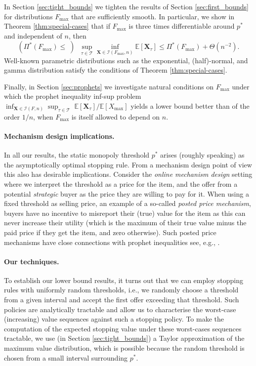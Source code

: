\documentclass[11pt,a4paper]{article}
\numberwithin{equation}{section}
\begin{document}
In Section \ref{sec:tight_bounds} we tighten the results of Section \ref{sec:first_bounds} for distributions $F_{\max}$ that are sufficiently smooth. In particular, we show in Theorem \ref{thm:special-cases} that if $F_{\max}$ is three times differentiable around $p^*$ and independent of $n$, then 
$$
\left( \Pi^*(F_{\max}) \leq \; \right) \; \;  \sup_{\tau\in\mathcal{T}} \inf_{\boldsymbol{X}\in\mathcal{I}(F_{\max}, n)} \mathbb{E}[\boldsymbol{X}_{\tau}] \leq \Pi^*(F_{\max})+\Theta\left(n^{-2}\right).
$$
Well-known parametric distributions such as the exponential, (half)-normal, and gamma distribution satisfy the conditions of Theorem \ref{thm:special-cases}.

Finally, in Section \ref{sec:prophets} we investigate natural conditions on $F_{\max}$ under which the prophet inequality inf-sup problem $\inf_{\boldsymbol{X}\in\mathcal{I}(F, n)}\sup_{\tau\in\mathcal{T}} \; \mathbb{E}[\boldsymbol{X}_{\tau}]/\mathbb{E}[X_{\max}]$ yields a lower bound better than of the order $1/n$, when $F_{\max}$ is itself allowed to depend on $n$. 
\noindent 
\paragraph{Mechanism design implications.} In all our results, the static monopoly threshold $p^*$ arises (roughly speaking) as the asymptotically optimal stopping rule. From a mechanism design point of view this also has desirable implications. Consider the \textit{online mechanism design} setting where we interpret the threshold as a price for the item, and the offer from a potential \textit{strategic} buyer as the price they are willing to pay for it. When using a fixed threshold as selling price, an example of a so-called \textit{posted price mechanism}, buyers have no incentive to misreport their (true) value for the item as this can never increase their utility (which is the maximum of their true value minus the paid price if they get the item, and zero otherwise). Such posted price mechanisms have close connections with prophet inequalities see, e.g., \cite{hajiaghayi2007automated,chawla2010multi,correa2019pricing}.

{
\paragraph{Our techniques.} To establish our lower bound results, it turns out that we can employ stopping rules with uniformly random thresholds, i.e., we randomly choose a threshold from a given interval and accept the first offer exceeding that threshold. Such policies are analytically tractable and allow us to characterise the worst-case (increasing) value sequences against such a stopping policy. To make the computation of the expected stopping value under these worst-cases sequences tractable, we use (in Section \ref{sec:tight_bounds}) a Taylor approximation of the maximum value distribution, which is possible because the random threshold is chosen from a small interval surrounding $p^*$.}
\end{document}
